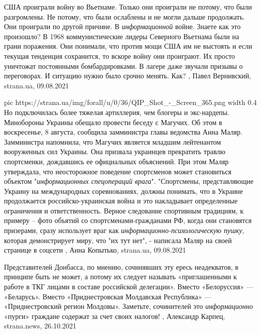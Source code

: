 США проиграли войну во Вьетнаме.  Только они проиграли не потому, что были
разгромлены. Не потому, что были ослаблены и не могли дальше продолжать.  Они
проиграли по другой причине. В \emph{информационной} войне.  Знаете как это произошло?
В 1968 коммунистические лидеры Северного Вьетнама были на грани поражения. Они
понимали, что против мощи США им не выстоять и если текущая тенденция
сохранится, то вскоре войну они проиграют. Их просто уничтожат постоянными
бомбардировками. В лагере даже звучали призывы о переговорах. И ситуацию нужно
было срочно менять.  Как?
, 
Павел Вернивский, strana.ua, 09.08.2021

\ifcmt
  pic https://strana.ua/img/forall/u/0/36/QIP_Shot_-_Screen_365.png
  width 0.4
\fi
Но подключилась более тяжелая артиллерия, чем блогеры и экс-нардепы.
Минобороны Украины обещало провести беседу с Магучих. Об этом в воскресенье, 8
августа, сообщила замминистра главы ведомства Анна Маляр.  Замминистра
напомнила, что Магучих является младшим лейтенантом вооруженных сил Украины.
Она призвала украинцев прекратить травлю спортсменки, дождавшись ее официальных
объяснений.  При этом Маляр утверждала, что неосторожное поведение спортсменов
может становиться объектом "\emph{информационных спецопераций врага}".
"Спортсмены, представляющие Украину на международных соревнованиях, должны
понимать, что в Украине продолжается российско-украинская война и это
накладывает определенные ограничения и ответственность.  Верное следование
спортивным традициям, к примеру – фото объятий со спортсменами-гражданами РФ,
когда они становятся призерами, сразу использует враг как
\emph{информационно-психологическую пушку}, которая демонстрирует миру, что "их
тут нет", - написала Маляр на своей странице в соцсети
, 
Анна Копытько, strana.ua, 09.08.2021

Представителей Донбасса, по мнению, сочинявших эту ересь неадекватов, в
принципе быть не может, а потому их следует называть «приглашенными к работе в
ТКГ лицами в составе российской делегации».  Вместо «Белоруссия» — «Беларусь».
Вместо «Приднестровская Молдавская Республика» — «Приднестровский регион
Молдовы».  Заметьте, сочинителей это \emph{информационно} «пурги» граждане
содержат за счет своих налогов!
, 
Александр Карпец, strana.news, 26.10.2021
